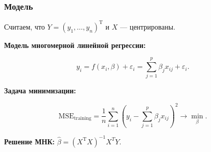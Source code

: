 \documentclass[unicode, notheorems]{beamer}
\newcommand{\R}{\mathbb{R}}
\newcommand{\E}{\mathbb{E}}
\newcommand{\T}{\mathrm{T}}
\begin{document}
\begin{frame}
\frametitle{Модель}

%
%
%
%
Считаем, что $Y = (y_1, \ldots, y_n)^{\T}$ и $X$ --- центрированы. %
\vspace{0.8cm}

\textbf{Модель многомерной линейной регрессии:}

\[y_i = f(x_i, \beta) + \varepsilon_i = \sum_{j=1}^p \beta_j x_{ij} + \varepsilon_i.\]

\textbf{Задача минимизации: } 

\[\mathrm{MSE}_{\mathrm{training}} = \frac{1}{n}\sum_{i=1}^n(y_i - \sum_{j=1}^p \beta_j x_{ij})^2 \rightarrow \min_{\beta}.\]
\vspace{0.6cm}

\textbf{Решение МНК: } $\hat{\beta} = (X^{\T}X)^{-1} X^{T}Y.$


\end{frame}

\end{document}
